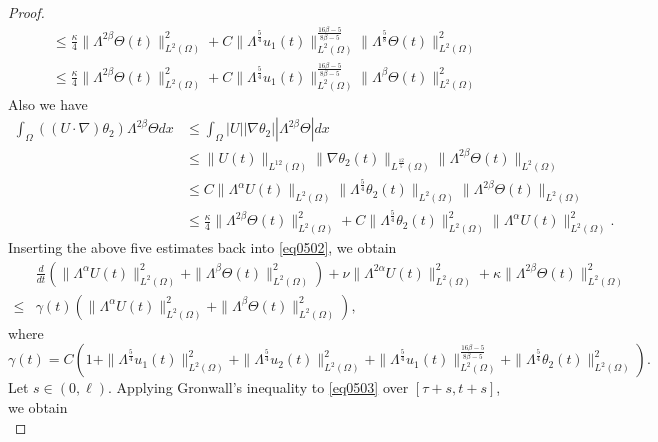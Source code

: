 \documentclass[oneside,preprint,12pt,numbers,sort&compress]{elsarticle}
\begin{document}
\begin{proof}
\begin{align*}
   & \leq \frac{\kappa}{4} \|\Lambda^{2\beta}\Theta(t) \|_{L^2(\Omega)}^2  + C \| \Lambda^{\frac{5}{4}} u_1 (t) \|_{L^2(\Omega)}^{\frac{16\beta-5}{8\beta-5}}
   \|\Lambda^{\frac{5}{8}}\Theta(t) \|_{L^2(\Omega)}^{2}\\
   & \leq \frac{\kappa}{4} \|\Lambda^{2\beta}\Theta(t) \|_{L^2(\Omega)}^2  + C \| \Lambda^{\frac{5}{4}} u_1 (t) \|_{L^2(\Omega)}^{\frac{16\beta-5}{8\beta-5}}
   \|\Lambda^{\beta}\Theta(t) \|_{L^2(\Omega)}^{2}
\end{align*}
Also we have
\begin{align*}
  \int_{\Omega} \left( (U \cdot \nabla) \theta_2 \right) \Lambda^{2\beta}\Theta dx
   & \leq \int_{\Omega}  |U| |\nabla \theta_2| |\Lambda^{2\beta}\Theta| dx \\
   & \leq \| U(t) \|_{L^{12}(\Omega)} \| \nabla \theta_2(t) \|_{L^{\frac{12}{5}}(\Omega)} \|\Lambda^{2\beta} \Theta(t) \|_{L^2(\Omega)} \\
   & \leq C\| \Lambda^{\alpha}U(t) \|_{L^{2}(\Omega)} \| \Lambda^{\frac{5}{4}} \theta_2 (t) \|_{L^2(\Omega)} \|\Lambda^{2\beta} \Theta(t) \|_{L^2(\Omega)} \\
   & \leq \frac{\kappa}{4} \| \Lambda^{2\beta} \Theta (t) \|_{L^{2}(\Omega)}^{2} + C \| \Lambda^{\frac{5}{4}} \theta_2(t) \|_{L^2(\Omega)}^{2} \| \Lambda^{\alpha}U(t) \|_{L^2(\Omega)}^{2}.
\end{align*}
Inserting the above five estimates back into \cref{eq0502}, we obtain
\begin{equation}\label{eq0503}
\begin{aligned}
& \frac{d}{dt}
\left( 
\| \Lambda^{\alpha}U(t) \|_{L^2(\Omega)}^{2} + \| \Lambda^{\beta}\Theta (t) \|_{L^2(\Omega)}^{2} 
\right)
+\nu \| \Lambda^{2\alpha}U(t) \|_{L^2(\Omega)}^{2} 
+\kappa \| \Lambda^{2\beta}\Theta(t) \|_{L^2(\Omega)}^{2} 
\\
\leq
& 
\gamma(t)
\left( 
\| \Lambda^{\alpha}U(t) \|_{L^2(\Omega)}^{2} + \| \Lambda^{\beta}\Theta (t) \|_{L^2(\Omega)}^{2}
\right),
\end{aligned}
\end{equation}
where
$$
\gamma(t)=
C \left( 1+
\| \Lambda^{\frac{5}{4}}u_1 (t) \|_{L^2(\Omega)}^{2} 
+\| \Lambda^{\frac{5}{4}}u_2 (t) \|_{L^2(\Omega)}^{2} 
+ \| \Lambda^{\frac{5}{4}} u_1 (t) \|_{L^2(\Omega)}^{\frac{16\beta-5}{8\beta-5}}
+ \| \Lambda^{\frac{5}{4}}\theta_2 (t) \|_{L^2(\Omega)}^{2} 
\right).
$$
Let $s \in (0, \ell)$. Applying Gronwall's inequality to \cref{eq0503} over $[\tau + s, t + s]$, we obtain
\begin{equation}\label{eq0504}

\end{equation}
\end{proof}
\end{document}
